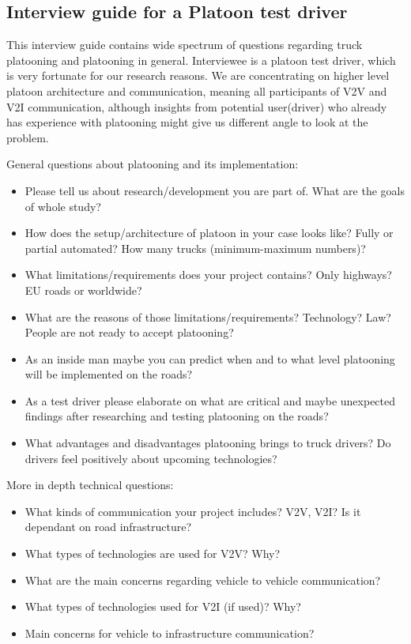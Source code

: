\subsection{Interview guide for a Platoon test driver}

This interview guide contains wide spectrum of questions regarding truck platooning and platooning in general. Interviewee is a platoon test driver, which is very fortunate for our research reasons. We are concentrating on higher level platoon architecture and communication, meaning all participants of V2V and V2I communication, although insights from potential user(driver) who already has experience with platooning might give us different angle to look at the problem.\par
% 
General questions about platooning and its implementation:
\begin{itemize}[noitemsep]
    \item Please tell us about research/development you are part of. What are the goals of whole study?
    \item How does the setup/architecture of platoon in your case looks like? Fully or partial automated? How many trucks (minimum-maximum numbers)?
    \item What limitations/requirements does your project contains? Only highways? EU roads or worldwide? 
    \item What are the reasons of those limitations/requirements? Technology? Law? People are not ready to accept platooning?
    \item As an inside man maybe you can predict when and to what level platooning will be implemented on the roads? \\
    \item As a test driver please elaborate on what are critical and maybe unexpected findings after researching and testing platooning on the roads?
    \item What advantages and disadvantages platooning brings to truck drivers? Do drivers feel positively about upcoming technologies?
\end{itemize}
%
\par
%
More in depth technical questions:
\begin{itemize}[noitemsep]
    \item What kinds of communication your project includes? V2V, V2I? Is it dependant on road infrastructure?
    \item What types of technologies are used for V2V? Why?
    \item What are the main concerns regarding vehicle to vehicle communication?
    \item What types of technologies used for V2I (if used)? Why?
    \item Main concerns for vehicle to infrastructure communication?
\end{itemize}